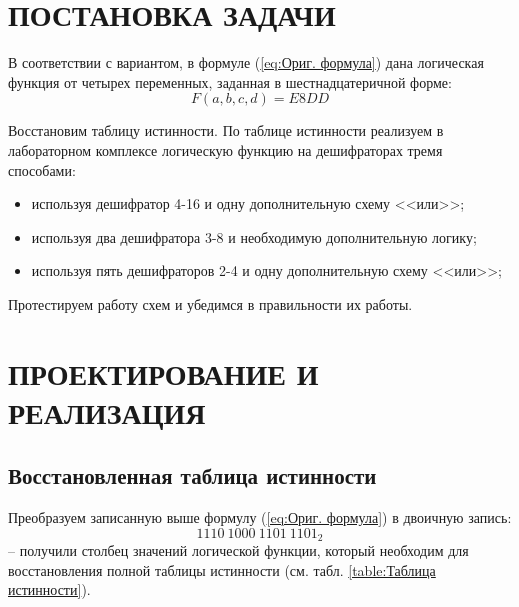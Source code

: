 \documentclass{mirea}
\author     {Краснов Н.O.}
\begin{document}
	
\chapter{ПОСТАНОВКА ЗАДАЧИ}
В соответствии с вариантом, в формуле (\ref{eq:Ориг. формула}) дана логическая функция от четырех переменных, заданная в шестнадцатеричной форме:
\begin{equation} \label{eq:Ориг. формула}
	F(a,b,c,d)=E8DD
\end{equation}

Восстановим таблицу истинности. По таблице истинности реализуем в лабораторном комплексе логическую функцию на дешифраторах тремя способами:
\begin{itemize}
	\item используя дешифратор 4-16 и одну дополнительную схему <<или>>;
	\item используя два дешифратора 3-8 и необходимую дополнительную логику;
	\item используя пять дешифраторов 2-4 и одну дополнительную схему <<или>>;
\end{itemize}

Протестируем работу схем и убедимся в правильности их работы.

\chapter{ПРОЕКТИРОВАНИЕ И РЕАЛИЗАЦИЯ}
\section{Восстановленная таблица истинности}
Преобразуем записанную выше формулу (\ref{eq:Ориг. формула}) в двоичную запись:
\[1110\ 1000\ 1101\ 1101_{2}\] – получили столбец значений логической функции, который необходим для восстановления полной таблицы истинности (см. табл. \ref{table:Таблица истинности}).
\end{document}
